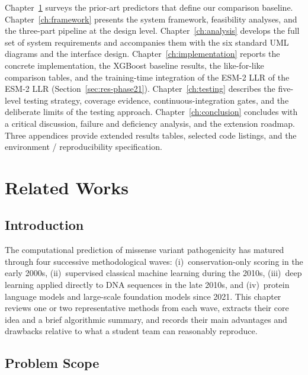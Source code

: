 \documentclass[11pt,a4paper,oneside]{report}
\begin{document}
Chapter~\ref{ch:related} surveys the prior-art
predictors that define our comparison baseline.
Chapter~\ref{ch:framework} presents the system framework,
feasibility analyses, and the three-part pipeline at the
design level. Chapter~\ref{ch:analysis} develops the full
set of system requirements and accompanies them with the
six standard UML diagrams and the interface design.
Chapter~\ref{ch:implementation} reports the concrete
implementation, the XGBoost baseline results, the like-for-like
comparison tables, and the training-time integration of the ESM-2 LLR
of the ESM-2 LLR (Section~\ref{sec:res-phase21}).
Chapter~\ref{ch:testing} describes the five-level testing
strategy, coverage evidence, continuous-integration gates,
and the deliberate limits of the testing approach.
Chapter~\ref{ch:conclusion} concludes with a critical
discussion, failure and deficiency analysis, and the
extension roadmap. Three appendices provide extended results
tables, selected code listings, and the environment /
reproducibility specification.


\chapter{Related Works}
\label{ch:related}

\section{Introduction}
\label{sec:rw-intro}

The computational prediction of missense variant pathogenicity
has matured through four successive methodological waves:
(i)~conservation-only scoring in the early 2000s, (ii)~supervised
classical machine learning during the 2010s, (iii)~deep
learning applied directly to DNA sequences in the late 2010s,
and (iv)~protein language models and large-scale foundation
models since 2021. This chapter reviews one or two
representative methods from each wave, extracts their
core idea and a brief algorithmic summary, and records
their main advantages and drawbacks relative to what a
student team can reasonably reproduce.

\section{Problem Scope}
\label{sec:rw-scope}
\end{document}
